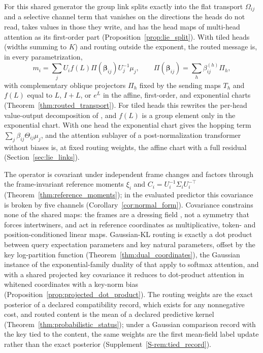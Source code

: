 \documentclass[twoside,11pt]{article}
\begin{document}
For this shared generator the group link splits exactly into the flat transport $\Omega_{ij}$ and a selective channel term that vanishes on the directions the heads do not read, takes values in those they write, and has the head maps of multi-head attention as its first-order part (Proposition~\ref{prop:lie_split}). With tiled heads (widths summing to $K$) and routing outside the exponent, the routed message is, in every parametrization,
\begin{equation}
m_i=\sum_jU_if(L)\Pi(\boldsymbol\beta_{ij})U_j^{-1}\mu_j,\qquad \Pi(\boldsymbol\beta_{ij})=\sum_h\beta^{(h)}_{ij}\Pi_h,
\end{equation}
with complementary oblique projectors $\Pi_h$ fixed by the sending maps $T_h$ and $f(L)$ equal to $L$, $I+L$, or $e^L$ in the affine, first-order, and exponential charts (Theorem~\ref{thm:routed_transport}). For tiled heads this rewrites the per-head value-output decomposition of \citet{elhage2021mathematical}, and $f(L)$ is a group element only in the exponential chart. With one head the exponential chart gives the hopping term $\sum_j\beta_{ij}\Theta_{ij}\mu_j$, and the attention sublayer of a post-normalization transformer without biases is, at fixed routing weights, the affine chart with a full residual (Section~\ref{sec:lie_links}).

The operator is covariant under independent frame changes and factors through the frame-invariant reference moments $\xi_i$ and $C_i=U_i^{-1}\Sigma_iU_i^{-\top}$ (Theorem~\ref{thm:reference_moments}); in the evaluated predictor this covariance is broken by five channels (Corollary~\ref{cor:normal_form}). Covariance constrains none of the shared maps: the frames are a dressing field \citep{Fournel2014Dressing,Francois2019Artificial}, not a symmetry that forces intertwiners, and act in reference coordinates as multiplicative, token- and position-conditioned linear maps. Gaussian-KL routing is exactly a dot product between query expectation parameters and key natural parameters, offset by the key log-partition function (Theorem~\ref{thm:dual_coordinates}), the Gaussian instance of the exponential-family duality of \citet{Banerjee2005Bregman} that \citet{Rubacher2026Fisher} apply to softmax attention, and with a shared projected key covariance it reduces to dot-product attention in whitened coordinates with a key-norm bias (Proposition~\ref{prop:projected_dot_product}). The routing weights are the exact posterior of a declared compatibility record, which exists for any nonnegative cost, and routed content is the mean of a declared predictive kernel (Theorem~\ref{thm:probabilistic_status}); under a Gaussian comparison record with the key tied to the content, the same weights are the first mean-field label update rather than the exact posterior (Supplement~\ref{S-rem:tied_record}).
\end{document}
